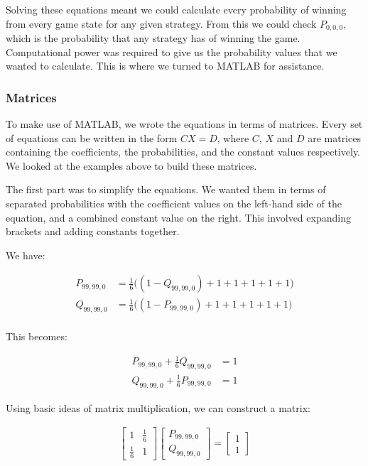 \documentclass[a4paper,titlepage]{article}
\begin{document}
Solving these equations meant we could calculate every probability of winning from every game state for any given strategy. From this we could check $P_{0,0,0}$, which is the probability that any strategy has of winning the game. Computational power was required to give us the probability values that we wanted to calculate. This is where we turned to MATLAB for assistance.

\subsubsection{Matrices}
To make use of MATLAB, we wrote the equations in terms of matrices. Every set of equations can be written in the form $CX=D$, where $C$, $X$ and $D$ are matrices containing the coefficients, the probabilities, and the constant values respectively. We looked at the examples above to build these matrices. 

The first part was to simplify the equations. We wanted them in terms of separated probabilities with the coefficient values on the left-hand side of the equation, and a combined constant value on the right. This involved expanding brackets and adding constants together.

 We have:

\begin{align*}
	P_{99,99,0} &= \frac{1}{6}\bigg((1 - Q_{99,99,0}) + 1 + 1 + 1 + 1 + 1\bigg)\\
	Q_{99,99,0} &= \frac{1}{6}\bigg((1 - P_{99,99,0}) + 1 + 1 + 1 + 1 + 1\bigg)\\
\end{align*}

This becomes:

\begin{align*}
	P_{99,99,0} + \frac{1}{6}Q_{99,99,0} &= 1\\
	Q_{99,99,0} + \frac{1}{6}P_{99,99,0} &= 1
\end{align*}

Using basic ideas of matrix multiplication, we can construct a matrix:

\begin{align*}
	\begin{bmatrix}
	    1          & \frac{1}{6}\\
	    \frac{1}{6} & 1
	\end{bmatrix}
	\begin{bmatrix}
		P_{99,99,0}\\
		Q_{99,99,0}
	\end{bmatrix}
	=
	\begin{bmatrix}
		1\\
		1
	\end{bmatrix}
\end{align*}
\end{document}
